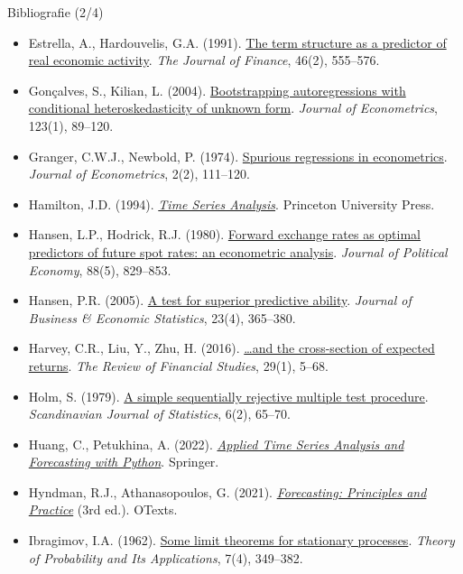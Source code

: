 \begin{frame}{Bibliografie (2/4)}
\itemsize{\tiny}
\begin{itemize}
    \item Estrella, A., Hardouvelis, G.A. (1991). \href{https://doi.org/10.1111/j.1540-6261.1991.tb02674.x}{The term structure as a predictor of real economic activity}. \emph{The Journal of Finance}, 46(2), 555--576.
    \item Gonçalves, S., Kilian, L. (2004). \href{https://doi.org/10.1016/j.jeconom.2003.10.030}{Bootstrapping autoregressions with conditional heteroskedasticity of unknown form}. \emph{Journal of Econometrics}, 123(1), 89--120.
    \item Granger, C.W.J., Newbold, P. (1974). \href{https://doi.org/10.1016/0304-4076(74)90034-7}{Spurious regressions in econometrics}. \emph{Journal of Econometrics}, 2(2), 111--120.
    \item Hamilton, J.D. (1994). \href{https://doi.org/10.2307/j.ctv14jx6sm}{\emph{Time Series Analysis}}. Princeton University Press.
    \item Hansen, L.P., Hodrick, R.J. (1980). \href{https://doi.org/10.1086/260910}{Forward exchange rates as optimal predictors of future spot rates: an econometric analysis}. \emph{Journal of Political Economy}, 88(5), 829--853.
    \item Hansen, P.R. (2005). \href{https://doi.org/10.1198/073500105000000063}{A test for superior predictive ability}. \emph{Journal of Business \& Economic Statistics}, 23(4), 365--380.
    \item Harvey, C.R., Liu, Y., Zhu, H. (2016). \href{https://doi.org/10.1093/rfs/hhv059}{\ldots and the cross-section of expected returns}. \emph{The Review of Financial Studies}, 29(1), 5--68.
    \item Holm, S. (1979). \href{https://www.jstor.org/stable/4615733}{A simple sequentially rejective multiple test procedure}. \emph{Scandinavian Journal of Statistics}, 6(2), 65--70.
    \item Huang, C., Petukhina, A. (2022). \href{https://doi.org/10.1007/978-3-031-13584-2}{\emph{Applied Time Series Analysis and Forecasting with Python}}. Springer.
    \item Hyndman, R.J., Athanasopoulos, G. (2021). \href{https://otexts.com/fpp3/}{\emph{Forecasting: Principles and Practice}} (3rd ed.). OTexts.
    \item Ibragimov, I.A. (1962). \href{https://doi.org/10.1137/1107036}{Some limit theorems for stationary processes}. \emph{Theory of Probability and Its Applications}, 7(4), 349--382.

\end{itemize}
\end{frame}
